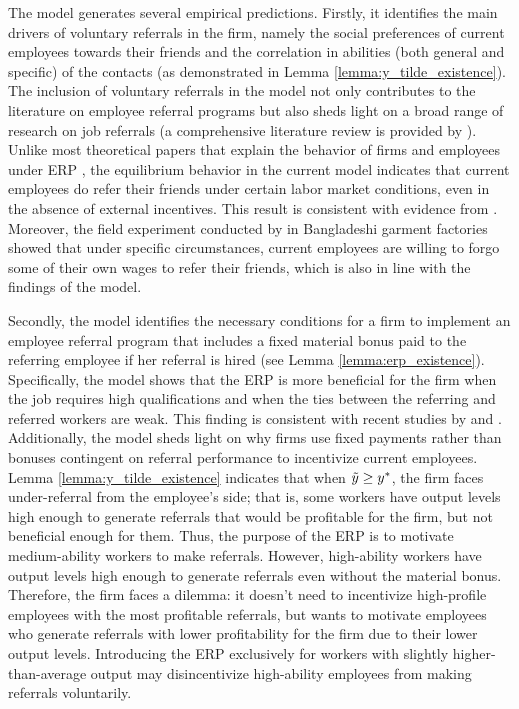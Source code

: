 \documentclass[12pt]{article}
\begin{document}
The model generates several empirical predictions. Firstly, it identifies the main drivers of voluntary referrals in the firm, namely the social preferences of current employees towards their friends and the correlation in abilities (both general and specific) of the contacts (as demonstrated in Lemma \ref{lemma:y_tilde_existence}). The inclusion of voluntary referrals in the model not only contributes to the literature on employee referral programs but also sheds light on a broad range of research on job referrals (a comprehensive literature review is provided by \cite{topa2011labor}). Unlike most theoretical papers that explain the behavior of firms and employees under ERP \citep{beaman2012gets, ekinci2016employee}, the equilibrium behavior in the current model indicates that current employees do refer their friends under certain labor market conditions, even in the absence of external incentives. This result is consistent with evidence from \cite{holzer1987hiring, granovetter1995getting, pellizzari2010friends, lester2021heterogeneous}. Moreover, the field experiment conducted by \cite{heath2018firms} in Bangladeshi garment factories showed that under specific circumstances, current employees are willing to forgo some of their own wages to refer their friends, which is also in line with the findings of the model.

Secondly, the model identifies the necessary conditions for a firm to implement an employee referral program that includes a fixed material bonus paid to the referring employee if her referral is hired (see Lemma \ref{lemma:erp_existence}). Specifically, the model shows that the ERP is more beneficial for the firm when the job requires high qualifications and when the ties between the referring and referred workers are weak. This finding is consistent with recent studies by \cite{friebel2023employee} and \cite{lester2021heterogeneous}. Additionally, the model sheds light on why firms use fixed payments rather than bonuses contingent on referral performance to incentivize current employees. Lemma \ref{lemma:y_tilde_existence} indicates that when $\Tilde{y} \geq y^*$, the firm faces under-referral from the employee's side; that is, some workers have output levels high enough to generate referrals that would be profitable for the firm, but not beneficial enough for them. Thus, the purpose of the ERP is to motivate medium-ability workers to make referrals. However, high-ability workers have output levels high enough to generate referrals even without the material bonus. Therefore, the firm faces a dilemma: it doesn't need to incentivize high-profile employees with the most profitable referrals, but wants to motivate employees who generate referrals with lower profitability for the firm due to their lower output levels. Introducing the ERP exclusively for workers with slightly higher-than-average output  may disincentivize high-ability employees from making referrals voluntarily.
\end{document}

